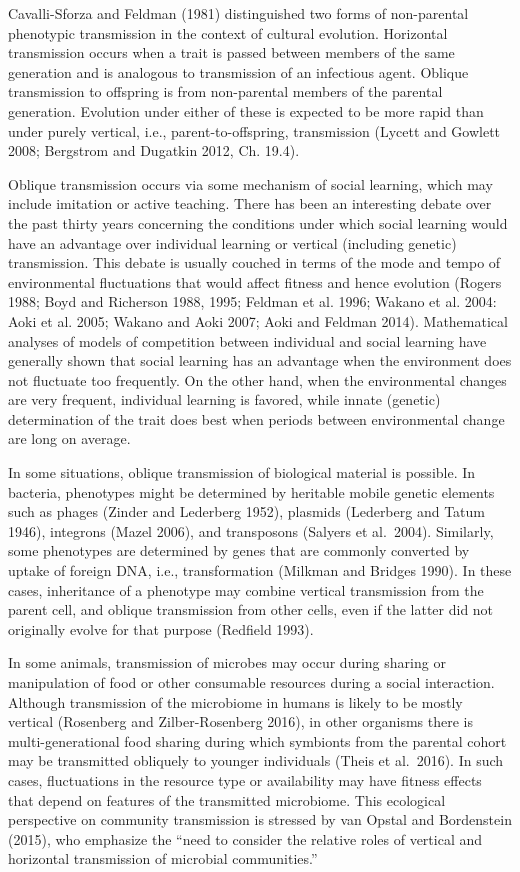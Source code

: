 \smallskip

Cavalli-Sforza and Feldman (1981) distinguished two forms of non-parental phenotypic transmission in the context of cultural evolution. Horizontal transmission  occurs when a trait is passed between members of the same generation and is analogous to transmission of an infectious agent. Oblique transmission to offspring is from non-parental members of the parental generation. Evolution under either of these is expected to be more rapid than under purely vertical, i.e., parent-to-offspring, transmission (Lycett and Gowlett 2008; Bergstrom and Dugatkin 2012, Ch. 19.4).

Oblique transmission occurs via some mechanism of social learning, which may include imitation or active teaching. There has been an interesting debate over the past thirty years concerning the conditions under which social learning would have an advantage over individual learning or vertical (including genetic) transmission. This debate is usually couched in terms of the mode and tempo of environmental fluctuations that would affect fitness and hence evolution (Rogers 1988; Boyd and Richerson 1988, 1995; Feldman et al. 1996; Wakano et al. 2004: Aoki et al. 2005; Wakano and Aoki 2007; Aoki and Feldman 2014). Mathematical analyses of models of competition between individual and social learning have generally shown that social learning has an advantage when the environment does not fluctuate too frequently. On the other hand, when the environmental changes are very frequent, individual learning is favored, while innate (genetic) determination of the trait does best when periods between environmental change are long on average.

In some situations, oblique transmission of biological material is possible. In bacteria, phenotypes might be determined by heritable mobile genetic elements such as phages (Zinder and Lederberg 1952), plasmids (Lederberg and Tatum 1946), integrons (Mazel 2006), and transposons (Salyers et al.\ 2004). Similarly, some phenotypes are determined by genes that are commonly converted by uptake of foreign DNA, i.e., transformation (Milkman and Bridges 1990). In these cases, inheritance of a phenotype may combine vertical transmission from the parent cell, and oblique transmission from other cells, even if the latter did not originally evolve for that purpose (Redfield 1993). 

In some animals, transmission of microbes may occur during sharing or manipulation of food or other consumable resources during a social interaction. Although transmission of the microbiome in humans is likely to be mostly vertical (Rosenberg and Zilber-Rosenberg 2016), in other organisms there is multi-generational food sharing during which symbionts from the parental cohort may be transmitted obliquely to younger individuals (Theis et al.\ 2016). In such cases, fluctuations in the resource type or availability may have fitness effects that depend on features of the transmitted microbiome. This ecological perspective on community transmission is stressed by van Opstal and Bordenstein (2015), who emphasize the ``need to consider the relative roles of vertical and horizontal transmission of microbial communities.''

